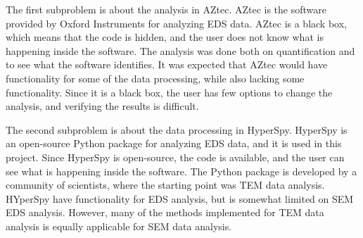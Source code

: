 \begin{center}
\end{center}



The first subproblem is about the analysis in AZtec.
AZtec is the software provided by Oxford Instruments for analyzing EDS data.
AZtec is a black box, which means that the code is hidden, and the user does not know what is happening inside the software.
The analysis was done both on quantification and to see what the software identifies.
It was expected that AZtec would have functionality for some of the data processing, while also lacking some functionality.
Since it is a black box, the user has few options to change the analysis, and verifying the results is difficult.

\begin{center}
\end{center}



The second subproblem is about the data processing in HyperSpy.
HyperSpy is an open-source Python package for analyzing EDS data, and it is used in this project.
Since HyperSpy is open-source, the code is available, and the user can see what is happening inside the software.
The Python package is developed by a community of scientists, where the starting point was TEM data analysis.
HYperSpy have functionality for EDS analysis, but is somewhat limited on SEM EDS analysis.
However, many of the methods implemented for TEM data analysis is equally applicable for SEM data analysis.

\begin{center}
\end{center}




